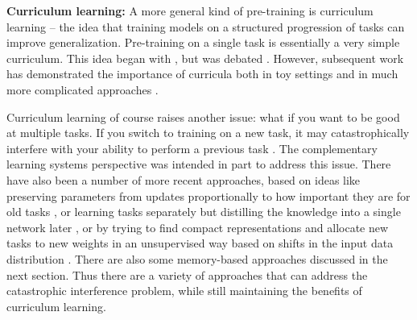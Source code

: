 \documentclass[11pt]{article}
\begin{document}
\textbf{Curriculum learning:} A more general kind of pre-training is curriculum learning \citep{Bengio2009} -- the idea that training models on a structured progression of tasks can improve generalization. Pre-training on a single task is essentially a very simple curriculum. This idea began with \citet{Elman1993}, but was debated \citep[e.g.]{Rohde1997}. However, subsequent work has demonstrated the importance of curricula both in toy settings \citep{Gulcehre2013} and in much more complicated approaches \citep[discussed below, for example]{Graves2016}. \par
Curriculum learning of course raises another issue: what if you want to be good at multiple tasks. If you switch to training on a new task, it may catastrophically interfere with your ability to perform a previous task \citep{McCloskey1989}. The complementary learning systems perspective \citep{McClelland1995, Kumaran2016} was intended in part to address this issue. There have also been a number of more recent approaches, based on ideas like preserving parameters from updates proportionally to how important they are for old tasks \citep{Kirkpatrick2016}, or learning tasks separately but distilling the knowledge into a single network later \citep{Rusu2015}, or by trying to find compact representations and allocate new tasks to new weights in an unsupervised way based on shifts in the input data distribution \citep{Achille2018a}. There are also some memory-based approaches discussed in the next section. Thus there are a variety of approaches that can address the catastrophic interference problem, while still maintaining the benefits of curriculum learning. \par
\end{document}
